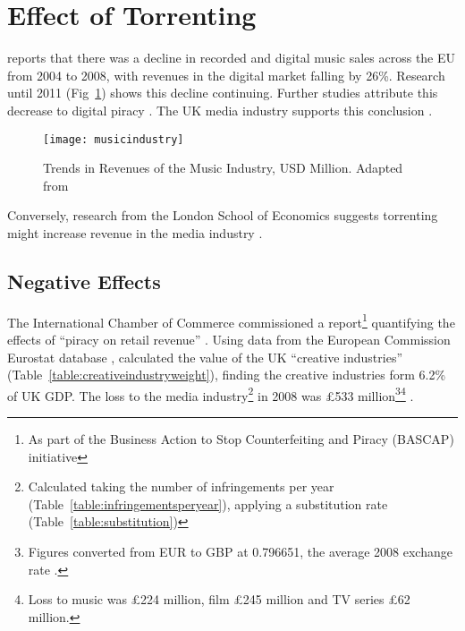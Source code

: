 \section{Effect of Torrenting}

\citet{pwc2009} reports that there was a decline in recorded and digital music sales across the EU from 2004 to 2008, with revenues in the digital market falling by 26\%. Research until 2011 (Fig~\ref{fig:musicindustry}) shows this decline continuing. Further studies attribute this decrease to digital piracy \citep{tera2010,peitz2004,zentner2006}. The UK media industry supports this conclusion \citep{factuk2014, ccc2014, bpi2013}.

\begin{figure}[h]
    \centering
    \texttt{[image: musicindustry]}
    \caption{Trends in Revenues of the Music Industry, USD Million. Adapted from \citet[Fig. 1]{lse2013}}
    \label{fig:musicindustry}
\end{figure}

Conversely, research from the London School of Economics suggests torrenting might increase revenue in the media industry \citep{lse2013, hammond13,aguiar2013}.

\subsection{Negative Effects}

The International Chamber of Commerce commissioned a report\footnote{As part of the Business Action to Stop Counterfeiting and Piracy (BASCAP) initiative} quantifying the effects of ``piracy on retail revenue'' \citep{tera2010}.  
%
Using data from the European Commission Eurostat database \citep{eurostat}, \citet{tera2010} calculated the value of the UK ``creative industries'' (Table~\ref{table:creativeindustryweight}), finding the creative industries form 6.2\% of UK GDP. %
%
The loss to the media industry\footnote{Calculated taking the number of infringements per year (Table~\ref{table:infringementsperyear}), applying a substitution rate (Table~\ref{table:substitution})} in 2008 was \pounds{533} million\footnote{\label{foot1}Figures converted from EUR to GBP at 0.796651, the average 2008 exchange rate \citep{exchangerate2008}.}\footnote{Loss to music was \pounds{224} million, film \pounds{245} million and TV series \pounds{62} million.} \citep[p.31]{tera2010}.

